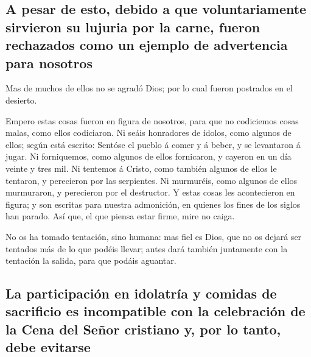 \hypertarget{a-pesar-de-esto-debido-a-que-voluntariamente-sirvieron-su-lujuria-por-la-carne-fueron-rechazados-como-un-ejemplo-de-advertencia-para-nosotros}{%
\subsection{A pesar de esto, debido a que voluntariamente sirvieron su
lujuria por la carne, fueron rechazados como un ejemplo de advertencia
para
nosotros}\label{a-pesar-de-esto-debido-a-que-voluntariamente-sirvieron-su-lujuria-por-la-carne-fueron-rechazados-como-un-ejemplo-de-advertencia-para-nosotros}}

 Mas de muchos de ellos no se agradó Dios; por lo cual
fueron postrados en el desierto.

 Empero estas cosas fueron en figura de nosotros, para que
no codiciemos cosas malas, como ellos codiciaron.  Ni seáis
honradores de ídolos, como algunos de ellos; según está escrito: Sentóse
el pueblo á comer y á beber, y se levantaron á jugar.  Ni
forniquemos, como algunos de ellos fornicaron, y cayeron en un día
veinte y tres mil.  Ni tentemos á Cristo, como también
algunos de ellos le tentaron, y perecieron por las serpientes.
 Ni murmuréis, como algunos de ellos murmuraron, y
perecieron por el destructor.  Y estas cosas les
acontecieron en figura; y son escritas para nuestra admonición, en
quienes los fines de los siglos han parado.  Así que, el
que piensa estar firme, mire no caiga.

 No os ha tomado tentación, sino humana: mas fiel es Dios,
que no os dejará ser tentados más de lo que podéis llevar; antes dará
también juntamente con la tentación la salida, para que podáis aguantar.

\hypertarget{la-participaciuxf3n-en-idolatruxeda-y-comidas-de-sacrificio-es-incompatible-con-la-celebraciuxf3n-de-la-cena-del-seuxf1or-cristiano-y-por-lo-tanto-debe-evitarse}{%
\subsection{La participación en idolatría y comidas de sacrificio es
incompatible con la celebración de la Cena del Señor cristiano y, por lo
tanto, debe
evitarse}\label{la-participaciuxf3n-en-idolatruxeda-y-comidas-de-sacrificio-es-incompatible-con-la-celebraciuxf3n-de-la-cena-del-seuxf1or-cristiano-y-por-lo-tanto-debe-evitarse}}

